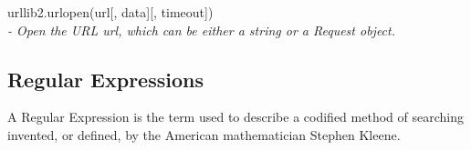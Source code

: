 urllib2.urlopen(url[, data][, timeout])\\[0.5cm]

\emph{ - Open the URL url, which can be either a string or a Request object.}

\subsection{Regular Expressions}
A Regular Expression is the term used to describe a codified method of searching invented, or defined, by the American mathematician Stephen Kleene.\cite{whatisregex}